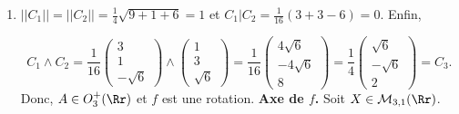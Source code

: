 {{\begin{enumerate}
$$AX=X\Leftrightarrow\left\{
\begin{array}{l}
-x-y-2z=0\\
-2x-5y-z=0\\
-x+2y-5z=0
\end{array}
\right.\Leftrightarrow\left\{
\begin{array}{l}
z=-2x-5y\\
3x+9y=0\\
9x+27y=0
\end{array}
\right.\Leftrightarrow\left\{
\begin{array}{l}
x=-3y\\
z=y
\end{array}
\right..$$ 
L'axe $D$ de $f$ est $\mbox{Vect}(\overrightarrow{u})$ où $\overrightarrow{u}=(-3,1,1)$. $D$ est dorénavant orienté par $\overrightarrow{u}$.
\textbf{Angle de $f$.} Le vecteur $\overrightarrow{v}=\frac{1}{\sqrt{2}}(0,1,-1)$ est un vecteur unitaire orthogonal à l'axe. Donc,

$$\cos\theta=\overrightarrow{v}.f(\overrightarrow{v})=\frac{1}{\sqrt{2}}(0,1,-1).\frac{1}{\sqrt{2}}\frac{-1}{3}(-1,1,-4)=-\frac{1}{6}\times5
=-\frac{5}{6},$$
et donc, $\theta=\pm\Arccos(-\frac{5}{6})\;(2\pi)$. (Si on sait que $\text{Tr}(A)=2\cos\theta+1$, c'est plus court : $2\cos\theta+1=\frac{2}{3}-\frac{2}{3}-\frac{2}{3}$ fournit $\cos\theta=-\frac{5}{6}$).
Le signe de $\sin\theta$ est le signe de $[\overrightarrow{i},f(\overrightarrow{i}),\overrightarrow{u}]=\left|
\begin{array}{ccc}
1&\frac{2}{3}&-3\\
0&-\frac{2}{3}&1\\
0&-\frac{1}{3}&1\\
\end{array}
\right|=-\frac{1}{3}<0$. Donc, 

\begin{center}
\end{center}
 \item  $||C_1||=||C_2||=\frac{1}{4}\sqrt{9+1+6}=1$ et $C_1|C_2=\frac{1}{16}(3+3-6)=0$. Enfin, 

$$C_1\wedge C_2=\frac{1}{16}\left(
\begin{array}{c}
3\\
1\\
-\sqrt{6}
\end{array}
\right)\wedge\left(
\begin{array}{c}
1\\
3\\
\sqrt{6}
\end{array}
\right)
=\frac{1}{16}\left(
\begin{array}{c}
4\sqrt{6}\\
-4\sqrt{6}\\
8
\end{array}
\right)=\frac{1}{4}\left(
\begin{array}{c}
\sqrt{6}\\
-\sqrt{6}\\
2
\end{array}
\right)
=C_3.$$
Donc, $A\in O_3^+(\Rr)$ et $f$ est une rotation.
\textbf{Axe de $f$.} Soit $X\in\mathcal{M}_{3,1}(\Rr)$.


\end{enumerate}}}

